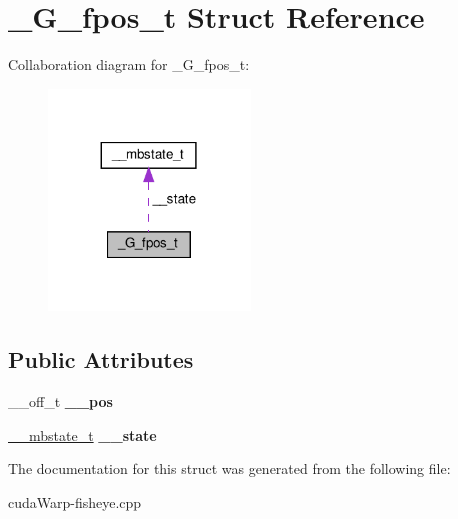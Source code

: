 \hypertarget{struct__G__fpos__t}{}\section{\+\_\+\+G\+\_\+fpos\+\_\+t Struct Reference}
\label{struct__G__fpos__t}


Collaboration diagram for \+\_\+\+G\+\_\+fpos\+\_\+t\+:\nopagebreak
\begin{figure}[H]
\begin{center}
\leavevmode
\includegraphics[width=152pt]{struct__G__fpos__t__coll__graph}
\end{center}
\end{figure}
\subsection*{Public Attributes}
\begin{DoxyCompactItemize}
\item 
\+\_\+\+\_\+off\+\_\+t {\bfseries \+\_\+\+\_\+pos}\hypertarget{struct__G__fpos__t_a1f3f051dff02b13553766b90e703ac1a}{}\label{struct__G__fpos__t_a1f3f051dff02b13553766b90e703ac1a}

\item 
\hyperlink{struct____mbstate__t}{\+\_\+\+\_\+mbstate\+\_\+t} {\bfseries \+\_\+\+\_\+state}\hypertarget{struct__G__fpos__t_a7bedfe55beff20f064b4cefa4f65e81d}{}\label{struct__G__fpos__t_a7bedfe55beff20f064b4cefa4f65e81d}

\end{DoxyCompactItemize}


The documentation for this struct was generated from the following file\+:\begin{DoxyCompactItemize}
\item 
cuda\+Warp-\/fisheye.\+cpp\end{DoxyCompactItemize}

